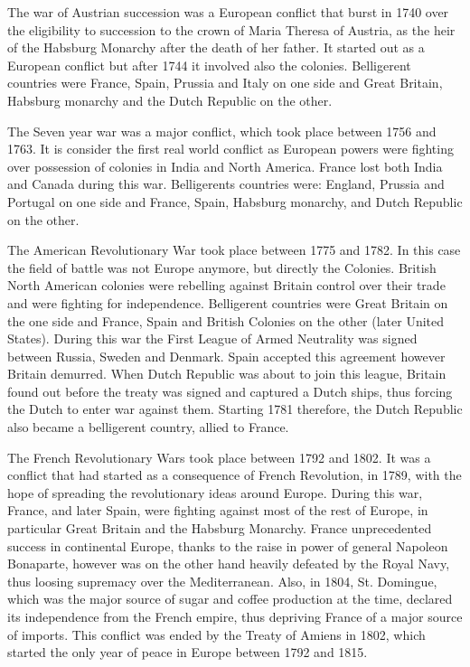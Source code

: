 \documentclass[12pt,a4paper,notitlepage,english]{article}
\begin{document}
The war of Austrian succession was a European conflict that burst in 1740 over the eligibility to succession to the crown of Maria Theresa of Austria, as the heir of the Habsburg Monarchy after the death of her father. It started out as a European conflict but after 1744 it involved also the colonies. Belligerent countries were France, Spain, Prussia and Italy on one side and Great Britain, Habsburg monarchy and the Dutch Republic on the other. 

The Seven year war was a major conflict, which took place between 1756 and 1763. It is consider the first real world conflict as European powers were fighting over possession of colonies in India and North America. France lost both India and Canada during this war. Belligerents countries were: England, Prussia and Portugal on one side and France, Spain, Habsburg monarchy, and Dutch Republic on the other. 

The American Revolutionary War took place between 1775 and 1782. In this case the field of battle was not Europe anymore, but directly the Colonies. British North American colonies were rebelling against Britain control over their trade and were fighting for independence. Belligerent countries were Great Britain on the one side and France, Spain and British Colonies on the other (later United States). During this war the First League of Armed Neutrality was signed between Russia, Sweden and Denmark. Spain accepted this agreement however Britain demurred. When Dutch Republic was about to join this league, Britain found out before the treaty was signed and captured a Dutch ships, thus forcing the Dutch to enter war against them. Starting 1781 therefore, the Dutch Republic also became a belligerent country, allied to France. 

The French Revolutionary Wars took place between 1792 and 1802. It was a conflict that had started as a consequence of French Revolution, in 1789, with the hope of spreading the revolutionary ideas around Europe. During this war, France, and later Spain, were fighting against most of the rest of Europe, in particular Great Britain and the Habsburg Monarchy. France unprecedented success in continental Europe, thanks to the raise in power of general Napoleon Bonaparte, however was on the other hand heavily defeated by the Royal Navy, thus loosing supremacy over the Mediterranean. Also, in 1804, St. Domingue, which was the major source of sugar and coffee production at the time, declared its independence from the French empire, thus depriving France of a major source of imports. This conflict was ended by the Treaty of Amiens in 1802, which started the only year of peace in Europe between 1792 and 1815.
\end{document}
